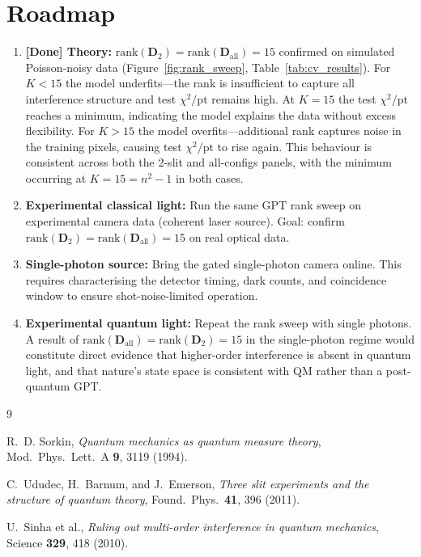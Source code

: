 \documentclass[12pt]{article}
\begin{document}
\section{Roadmap}

\begin{enumerate}
    \item \textcolor{green!60!black}{\textbf{[Done] Theory: }}
          $\mathrm{rank}(\mathbf{D}_2) = \mathrm{rank}(\mathbf{D}_{\mathrm{all}}) = 15$
          confirmed on simulated Poisson-noisy data (Figure~\ref{fig:rank_sweep},
          Table~\ref{tab:cv_results}).  For $K < 15$ the model underfits---the rank is
          insufficient to capture all interference structure and test $\chi^2/\mathrm{pt}$
          remains high.  At $K = 15$ the test $\chi^2/\mathrm{pt}$ reaches a minimum,
          indicating the model explains the data without excess flexibility.  For $K > 15$
          the model overfits---additional rank captures noise in the training pixels,
          causing test $\chi^2/\mathrm{pt}$ to rise again.  This behaviour is consistent
          across both the 2-slit and all-configs panels, with the minimum occurring at
          $K = 15 = n^2 - 1$ in both cases.

    \item \textbf{Experimental classical light:}
          Run the same GPT rank sweep on experimental camera data (coherent laser source).
          Goal: confirm $\mathrm{rank}(\mathbf{D}_2) = \mathrm{rank}(\mathbf{D}_{\mathrm{all}}) = 15$
          on real optical data.

    \item \textbf{Single-photon source:}
          Bring the gated single-photon camera online.  This requires characterising
          the detector timing, dark counts, and coincidence window to ensure
          shot-noise-limited operation.

    \item \textbf{Experimental quantum light:}
          Repeat the rank sweep with single photons.  A result of
          $\mathrm{rank}(\mathbf{D}_{\mathrm{all}}) = \mathrm{rank}(\mathbf{D}_2) = 15$
          in the single-photon regime would constitute direct evidence that higher-order
          interference is absent in quantum light, and that nature's state space is
          consistent with QM rather than a post-quantum GPT.
\end{enumerate}


\begin{thebibliography}{9}

R.~D. Sorkin,
\textit{Quantum mechanics as quantum measure theory},
Mod.\ Phys.\ Lett.\ A \textbf{9}, 3119 (1994).

C.~Ududec, H.~Barnum, and J.~Emerson,
\textit{Three slit experiments and the structure of quantum theory},
Found.\ Phys.\ \textbf{41}, 396 (2011).

U.~Sinha et al.,
\textit{Ruling out multi-order interference in quantum mechanics},
Science \textbf{329}, 418 (2010).

\end{thebibliography}
\end{document}
